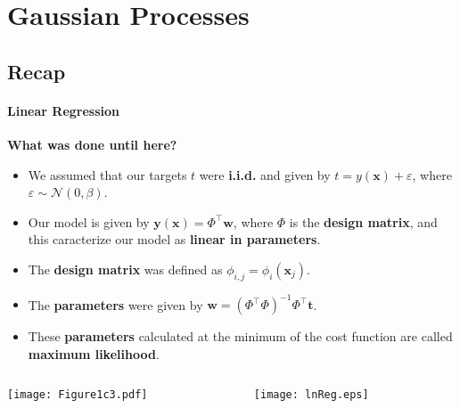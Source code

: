 \section{Gaussian Processes}
\framecard{\insertsection}

\subsection{Recap}
\begin{frame}{\insertsubsection}
    \framesubtitle{Linear Regression} 

    \textcolor{UniGold}{\textbf{What was done until here?}}
    \begin{itemize}
        \item We assumed that our targets $t$ were \textcolor{UniOrange}{\textbf{i.i.d.}} and given by $t = y(\mathbf{x}) + \varepsilon$, where $\varepsilon \sim \mathcal{N}(0,\beta)$.
        \item Our model is given by $\mathbf{y}(\mathbf{x}) = \Phi^{\top} \mathbf{w}$, where $\Phi$ is the \textcolor{UniOrange}{\textbf{design matrix}}, and this caracterize our model as \textcolor{UniOrange}{\textbf{linear in parameters}}.
        \item The \textcolor{UniOrange}{\textbf{design matrix}} was defined as $ \phi_{i,j} = \phi_i(\mathbf{x}_j)$.
        \item The \textcolor{UniOrange}{\textbf{parameters}} were given by $\mathbf{w} = \left( \Phi^{\top} \Phi \right)^{-1}\Phi^{\top} \mathbf{t}$.
        \item These \textcolor{UniOrange}{\textbf{parameters}} calculated at the minimum of the cost function are called \textcolor{UniOrange}{\textbf{maximum likelihood}}.
    \end{itemize}
    \begin{columns}
        \begin{column}{0.5\linewidth}  
        \begin{center}
        \centering
        \texttt{[image: Figure1c3.pdf]}
         \end{center}
    \end{column}
    \begin{column}{0.5\linewidth}  %
        \begin{center}
        \centering
        \texttt{[image: lnReg.eps]}
         \end{center}
    \end{column}
    \end{columns}

\end{frame}

